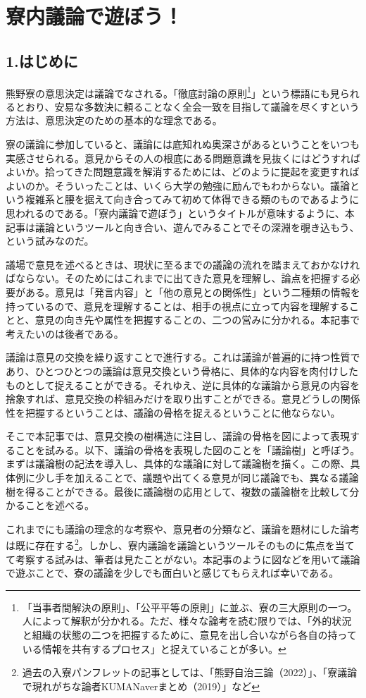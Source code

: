 \section{寮内議論で遊ぼう！}
\subsection{1.はじめに}
熊野寮の意思決定は議論でなされる。「徹底討論の原則\footnote{「当事者間解決の原則」、「公平平等の原則」に並ぶ、寮の三大原則の一つ。人によって解釈が分かれる。ただ、様々な論考を読む限りでは、「外的状況と組織の状態の二つを把握するために、意見を出し合いながら各自の持っている情報を共有するプロセス」と捉えていることが多い。}」という標語にも見られるとおり、安易な多数決に頼ることなく全会一致を目指して議論を尽くすという方法は、意思決定のための基本的な理念である。
\par
寮の議論に参加していると、議論には底知れぬ奥深さがあるということをいつも実感させられる。意見からその人の根底にある問題意識を見抜くにはどうすればよいか。拾ってきた問題意識を解消するためには、どのように提起を変更すればよいのか。そういったことは、いくら大学の勉強に励んでもわからない。議論という複雑系と腰を据えて向き合ってみて初めて体得できる類のものであるように思われるのである。「寮内議論で遊ぼう」というタイトルが意味するように、本記事は議論というツールと向き合い、遊んでみることでその深淵を覗き込もう、という試みなのだ。
\par
議場で意見を述べるときは、現状に至るまでの議論の流れを踏まえておかなければならない。そのためにはこれまでに出てきた意見を理解し、論点を把握する必要がある。意見は「発言内容」と「他の意見との関係性」という二種類の情報を持っているので、意見を理解することは、相手の視点に立って内容を理解することと、意見の向き先や属性を把握することの、二つの営みに分かれる。本記事で考えたいのは後者である。
\par
議論は意見の交換を繰り返すことで進行する。これは議論が普遍的に持つ性質であり、ひとつひとつの議論は意見交換という骨格に、具体的な内容を肉付けしたものとして捉えることができる。それゆえ、逆に具体的な議論から意見の内容を捨象すれば、意見交換の枠組みだけを取り出すことができる。意見どうしの関係性を把握するということは、議論の骨格を捉えるということに他ならない。
\par
そこで本記事では、意見交換の樹構造に注目し、議論の骨格を図によって表現することを試みる。以下、議論の骨格を表現した図のことを「議論樹」と呼ぼう。まずは議論樹の記法を導入し、具体的な議論に対して議論樹を描く。この際、具体例に少し手を加えることで、議題や出てくる意見が同じ議論でも、異なる議論樹を得ることができる。最後に議論樹の応用として、複数の議論樹を比較して分かることを述べる。
\par
これまでにも議論の理念的な考察や、意見者の分類など、議論を題材にした論考は既に存在する\footnote{過去の入寮パンフレットの記事としては、「熊野自治三論（2022）」、「寮議論で現れがちな論者KUMANaverまとめ（2019）」など}。しかし、寮内議論を議論というツールそのものに焦点を当てて考察する試みは、筆者は見たことがない。本記事のように図などを用いて議論で遊ぶことで、寮の議論を少しでも面白いと感じてもらえれば幸いである。
